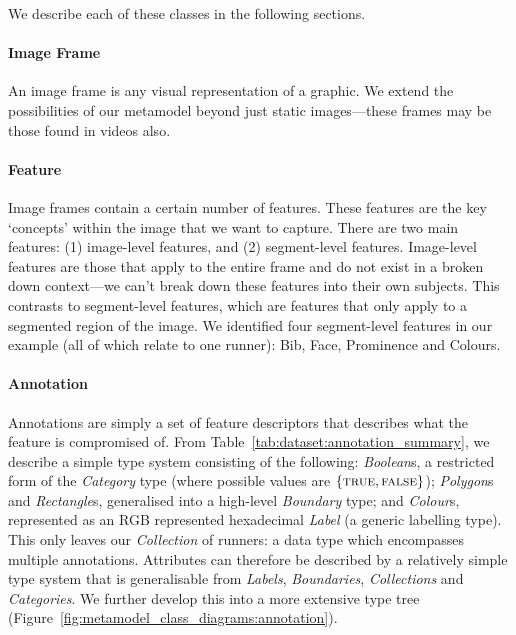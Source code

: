 We describe each of these classes in the following sections.

\paragraph{Image Frame}

An image frame is any visual representation of a graphic. We extend the possibilities of our metamodel beyond just static images---these frames may be those found in videos also.

\paragraph{Feature}

Image frames contain a certain number of features. These features are the key `concepts' within the image that we want to capture. There are two main features: (1) image-level features, and (2) segment-level features. Image-level features are those that apply to the entire frame and do not exist in a broken down context---we can't break down these features into their own subjects. This contrasts to segment-level features, which are features that only apply to a segmented region of the image. We identified four segment-level features in our example (all of which relate to one runner): Bib, Face, Prominence and Colours.

\paragraph{Annotation}

Annotations are simply a set of feature descriptors that describes what the feature is compromised of. From Table~\ref{tab:dataset:annotation_summary}, we describe a simple type system consisting of the following: \textit{Boolean}s, a restricted form of the \textit{Category} type (where possible values are $\{ \textsc{true}, \textsc{false} \}$); \textit{Polygon}s and \textit{Rectangle}s, generalised into a high-level \textit{Boundary} type; and \textit{Colour}s, represented as an RGB represented hexadecimal \textit{Label} (a generic labelling type). This only leaves our \textit{Collection} of runners: a data type which encompasses multiple annotations. Attributes can therefore be described by a relatively simple type system that is generalisable from \textit{Labels}, \textit{Boundaries}, \textit{Collections} and \textit{Categories}. We further develop this into a more extensive type tree (Figure~\ref{fig:metamodel_class_diagrams:annotation}).

